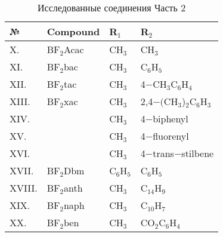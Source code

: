 \newpage

\begin{figure}[ht]
\label{fig:latex}
\end{figure}

\begin{table} [htbp]%
    \centering
    \caption{Исследованные соединения Часть 2}%
    \label{tab:comopund_list_2}%
    \renewcommand{\arraystretch}{1.5}%
    \begin{SingleSpace}
        \begin{tabular}{@{}@{\extracolsep{20pt}}llll@{}} %
            \toprule     %
            №      &Compound         & R$_1$      & R$_2$                           \\
            \midrule
            X.     & BF$_2$Acac      & CH$_3$     & CH$_3$                          \\
            XI.    & BF$_2$bac       & CH$_3$     & C$_6$H$_5$                      \\
            XII.   & BF$_2$tac       & CH$_3$     & 4$-$CH$_3$C$_6$H$_4$            \\
            XIII.  & BF$_2$xac       & CH$_3$     & 2,4$-($CH$_3$)$_2$C$_6$H$_3$    \\
            XIV.   &                 & CH$_3$     & 4$-$biphenyl                    \\
            XV.    &                 & CH$_3$     & 4$-$fluorenyl                   \\
            XVI.   &                 & CH$_3$     & 4$-$trans$-$stilbene            \\
            XVII.  & BF$_2$Dbm       & C$_6$H$_5$ & C$_6$H$_5$                      \\
            XVIII. & BF$_2$anth      & CH$_3$     & C$_{14}$H$_9$                   \\
            XIX.   & BF$_2$naph      & CH$_3$     & C$_{10}$H$_7$                   \\
            XX.    & BF$_2$ben       & CH$_3$     & CO$_2$C$_6$H$_4$                \\
            \bottomrule 
        \end{tabular}
    \end{SingleSpace}
\end{table}